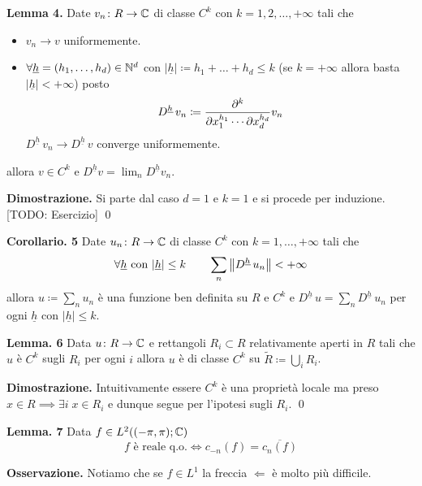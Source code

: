 \textbf{Lemma 4.}
Date $v_n \colon R \to \mathbb C$ di classe $C^k$ con $k = 1, 2, \dots, +\infty$ tali che
\begin{itemize}
	\item $v_n \to v$ uniformemente.

	\item $\forall \underline h = (h_1, \dots, h_d) \in \mathbb N^d$ con $|\underline h| \coloneqq h_1 + \dots + h_d \leq k$ (se $k = +\infty$ allora basta $|\underline h| < +\infty$) posto
		$$
		D^{\underline h} \, v_n \coloneqq
		\frac{\partial^k}{\partial x_1^{h_1} \cdots \partial x_d^{h_d}} v_n
		$$
		$D^{\underline h} \, v_n \to D^{\underline h} \, v$ converge uniformemente.
\end{itemize}
allora $v \in C^k$ e $D^{\underline h} v = \lim_{n} D^{\underline h} v_n$.

\textbf{Dimostrazione.}
Si parte dal caso $d = 1$ e $k = 1$ e si procede per induzione. [TODO: Esercizio]
\qed

\textbf{Corollario. 5}
Date $u_n \colon R \to \mathbb C$ di classe $C^k$ con $k = 1, \dots, +\infty$ tali che
$$
\forall \underline h \text{ con } |\underline h| \leq k \qquad \sum_n \left\lVert D^{\underline h} \, u_n \right\rVert < +\infty
$$
allora $u \coloneqq \sum_n u_n$ è una funzione ben definita su $R$ e $C^k$ e $D^{\underline h} \, u = \sum_n D^{\underline h} \, u_n$ per ogni $\underline h$ con $|\underline h| \leq k$.

\textbf{Lemma. 6}
Data $u \colon R \to \mathbb C$ e rettangoli $R_i \subset R$ relativamente aperti in $R$ tali che $u$ è $C^k$ sugli $R_i$ per ogni $i$ allora $u$ è di classe $C^k$ su $\tilde R \coloneqq \bigcup_i R_i$.

\textbf{Dimostrazione.}
Intuitivamente essere $C^k$ è una proprietà locale ma preso $x \in R \implies \exists i \; x \in R_i$ e dunque segue per l'ipotesi sugli $R_i$.
\qed

\textbf{Lemma. 7}
Data $f \in L^2((-\pi, \pi); \mathbb C)$
$$
f \text{ è reale q.o.} \iff c_{-n}(f) = \overline{c_n(f)}
$$

\textbf{Osservazione.}
Notiamo che se $f \in L^1$ la freccia $\boxed{\Leftarrow}$ è molto più difficile.

